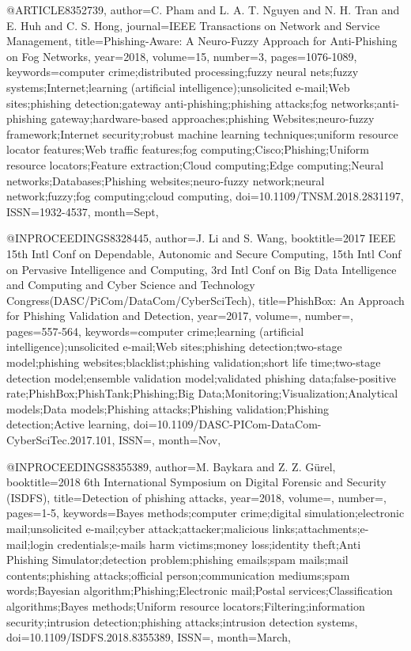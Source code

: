 @ARTICLE{8352739,
author={C. Pham and L. A. T. Nguyen and N. H. Tran and E. Huh and C. S. Hong},
journal={IEEE Transactions on Network and Service Management},
title={Phishing-Aware: A Neuro-Fuzzy Approach for Anti-Phishing on Fog Networks},
year={2018},
volume={15},
number={3},
pages={1076-1089},
keywords={computer crime;distributed processing;fuzzy neural nets;fuzzy systems;Internet;learning (artificial intelligence);unsolicited e-mail;Web sites;phishing detection;gateway anti-phishing;phishing attacks;fog networks;anti-phishing gateway;hardware-based approaches;phishing Websites;neuro-fuzzy framework;Internet security;robust machine learning techniques;uniform resource locator features;Web traffic features;fog computing;Cisco;Phishing;Uniform resource locators;Feature extraction;Cloud computing;Edge computing;Neural networks;Databases;Phishing websites;neuro-fuzzy network;neural network;fuzzy;fog computing;cloud computing},
doi={10.1109/TNSM.2018.2831197},
ISSN={1932-4537},
month={Sept},}

@INPROCEEDINGS{8328445,
author={J. Li and S. Wang},
booktitle={2017 IEEE 15th Intl Conf on Dependable, Autonomic and Secure Computing, 15th Intl Conf on Pervasive Intelligence and Computing, 3rd Intl Conf on Big Data Intelligence and Computing and Cyber Science and Technology Congress(DASC/PiCom/DataCom/CyberSciTech)},
title={PhishBox: An Approach for Phishing Validation and Detection},
year={2017},
volume={},
number={},
pages={557-564},
keywords={computer crime;learning (artificial intelligence);unsolicited e-mail;Web sites;phishing detection;two-stage model;phishing websites;blacklist;phishing validation;short life time;two-stage detection model;ensemble validation model;validated phishing data;false-positive rate;PhishBox;PhishTank;Phishing;Big Data;Monitoring;Visualization;Analytical models;Data models;Phishing attacks;Phishing validation;Phishing detection;Active learning},
doi={10.1109/DASC-PICom-DataCom-CyberSciTec.2017.101},
ISSN={},
month={Nov},}


@INPROCEEDINGS{8355389,
author={M. Baykara and Z. Z. Gürel},
booktitle={2018 6th International Symposium on Digital Forensic and Security (ISDFS)},
title={Detection of phishing attacks},
year={2018},
volume={},
number={},
pages={1-5},
keywords={Bayes methods;computer crime;digital simulation;electronic mail;unsolicited e-mail;cyber attack;attacker;malicious links;attachments;e-mail;login credentials;e-mails harm victims;money loss;identity theft;Anti Phishing Simulator;detection problem;phishing emails;spam mails;mail contents;phishing attacks;official person;communication mediums;spam words;Bayesian algorithm;Phishing;Electronic mail;Postal services;Classification algorithms;Bayes methods;Uniform resource locators;Filtering;information security;intrusion detection;phishing attacks;intrusion detection systems},
doi={10.1109/ISDFS.2018.8355389},
ISSN={},
month={March},}

